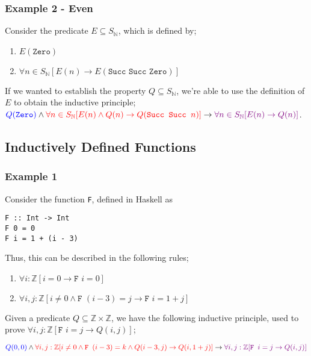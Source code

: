 \documentclass[a4paper, 12pt]{article}
\begin{document}
            \subsubsection*{Example 2 - Even}
                Consider the predicate $E \subseteq S_\mathbb{N}$, which is defined by;
                \begin{enumerate}[R1]
                    \itemsep0em
                    \item $E(\texttt{Zero})$
                    \item $\forall n \in S_\mathbb{N} [E(n) \rightarrow E(\texttt{Succ Succ Zero})]$
                \end{enumerate}
                If we wanted to establish the property $Q \subseteq S_\mathbb{N}$, we're able to use the definition of $E$ to obtain the inductive principle; $\textcolor{blue}{Q(\texttt{Zero})} \land \textcolor{red}{\forall n \in S_\mathbb{N} [E(n) \land Q(n) \rightarrow Q(\texttt{Succ Succ } n)]} \rightarrow \textcolor{violet}{\forall n \in S_\mathbb{N} [E(n) \rightarrow Q(n)]}$.
        \subsection*{Inductively Defined Functions}
            \subsubsection*{Example 1}
                Consider the function \texttt{F}, defined in Haskell as
                \begin{verbatim}
F :: Int -> Int
F 0 = 0
F i = 1 + (i - 3)\end{verbatim}
                Thus, this can be described in the following rules;
                \begin{enumerate}[R1]
                    \itemsep0em
                    \item $\forall i : \mathbb{Z} [i = 0 \rightarrow \texttt{F } i = 0]$
                    \item $\forall i, j : \mathbb{Z} [i \neq 0 \land \texttt{F } (i - 3) = j \rightarrow \texttt{F } i = 1 + j]$
                \end{enumerate}
                Given a predicate $Q \subseteq \mathbb{Z} \times \mathbb{Z}$, we have the following inductive principle, used to prove $\forall i, j : \mathbb{Z} [\texttt{F } i = j \rightarrow Q(i, j)]$;
                \medskip

                $\textcolor{blue}{Q(0, 0)} \land \textcolor{red}{\forall i, j : \mathbb{Z} [i \neq 0 \land \texttt{F } (i - 3) = k \land Q(i - 3, j) \rightarrow Q(i, 1 + j)]} \rightarrow \textcolor{violet}{\forall i, j : \mathbb{Z} [\texttt{F } i = j \rightarrow Q(i, j)]}$
                \medskip
\end{document}
